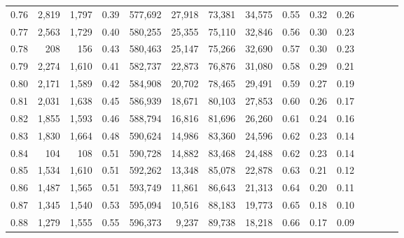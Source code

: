\begin{tabular}{rrrcrrrrrrrrrrr}
0.76 &   2,819 &  1,797 &                                       0.39 &  577,692 &   27,918 &   73,381 &   34,575 &  0.55 &  0.32 &                         0.26 \\
0.77 &   2,563 &  1,729 &                                       0.40 &  580,255 &   25,355 &   75,110 &   32,846 &  0.56 &  0.30 &                         0.23 \\
0.78 &     208 &    156 &                                       0.43 &  580,463 &   25,147 &   75,266 &   32,690 &  0.57 &  0.30 &                         0.23 \\
0.79 &   2,274 &  1,610 &                                       0.41 &  582,737 &   22,873 &   76,876 &   31,080 &  0.58 &  0.29 &                         0.21 \\
0.80 &   2,171 &  1,589 &                                       0.42 &  584,908 &   20,702 &   78,465 &   29,491 &  0.59 &  0.27 &                         0.19 \\
0.81 &   2,031 &  1,638 &                                       0.45 &  586,939 &   18,671 &   80,103 &   27,853 &  0.60 &  0.26 &                         0.17 \\
0.82 &   1,855 &  1,593 &                                       0.46 &  588,794 &   16,816 &   81,696 &   26,260 &  0.61 &  0.24 &                         0.16 \\
0.83 &   1,830 &  1,664 &                                       0.48 &  590,624 &   14,986 &   83,360 &   24,596 &  0.62 &  0.23 &                         0.14 \\
0.84 &     104 &    108 &                                       0.51 &  590,728 &   14,882 &   83,468 &   24,488 &  0.62 &  0.23 &                         0.14 \\
0.85 &   1,534 &  1,610 &                                       0.51 &  592,262 &   13,348 &   85,078 &   22,878 &  0.63 &  0.21 &                         0.12 \\
0.86 &   1,487 &  1,565 &                                       0.51 &  593,749 &   11,861 &   86,643 &   21,313 &  0.64 &  0.20 &                         0.11 \\
0.87 &   1,345 &  1,540 &                                       0.53 &  595,094 &   10,516 &   88,183 &   19,773 &  0.65 &  0.18 &                         0.10 \\
0.88 &   1,279 &  1,555 &                                       0.55 &  596,373 &    9,237 &   89,738 &   18,218 &  0.66 &  0.17 &                         0.09 \\

\end{tabular}
